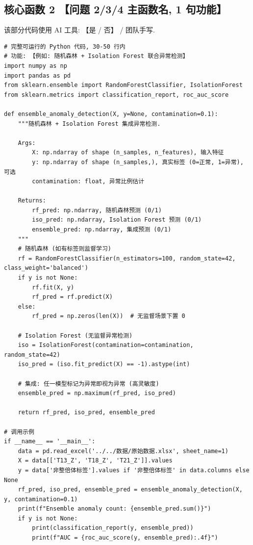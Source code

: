 \subsection*{核心函数 2 \quad 【问题 2/3/4 主函数名, 1 句功能】}

该部分代码使用 AI 工具: 【是 / 否】 / 团队手写.

\begin{verbatim}
# 完整可运行的 Python 代码, 30-50 行内
# 功能: 【例如: 随机森林 + Isolation Forest 联合异常检测】
import numpy as np
import pandas as pd
from sklearn.ensemble import RandomForestClassifier, IsolationForest
from sklearn.metrics import classification_report, roc_auc_score

def ensemble_anomaly_detection(X, y=None, contamination=0.1):
    """随机森林 + Isolation Forest 集成异常检测.

    Args:
        X: np.ndarray of shape (n_samples, n_features), 输入特征
        y: np.ndarray of shape (n_samples,), 真实标签 (0=正常, 1=异常), 可选
        contamination: float, 异常比例估计

    Returns:
        rf_pred: np.ndarray, 随机森林预测 (0/1)
        iso_pred: np.ndarray, Isolation Forest 预测 (0/1)
        ensemble_pred: np.ndarray, 集成预测 (0/1)
    """
    # 随机森林 (如有标签则监督学习)
    rf = RandomForestClassifier(n_estimators=100, random_state=42, class_weight='balanced')
    if y is not None:
        rf.fit(X, y)
        rf_pred = rf.predict(X)
    else:
        rf_pred = np.zeros(len(X))  # 无监督场景下置 0

    # Isolation Forest (无监督异常检测)
    iso = IsolationForest(contamination=contamination, random_state=42)
    iso_pred = (iso.fit_predict(X) == -1).astype(int)

    # 集成: 任一模型标记为异常即视为异常 (高灵敏度)
    ensemble_pred = np.maximum(rf_pred, iso_pred)

    return rf_pred, iso_pred, ensemble_pred

# 调用示例
if __name__ == '__main__':
    data = pd.read_excel('../../数据/原始数据.xlsx', sheet_name=1)
    X = data[['T13_Z', 'T18_Z', 'T21_Z']].values
    y = data['非整倍体标签'].values if '非整倍体标签' in data.columns else None
    rf_pred, iso_pred, ensemble_pred = ensemble_anomaly_detection(X, y, contamination=0.1)
    print(f"Ensemble anomaly count: {ensemble_pred.sum()}")
    if y is not None:
        print(classification_report(y, ensemble_pred))
        print(f"AUC = {roc_auc_score(y, ensemble_pred):.4f}")
\end{verbatim}


